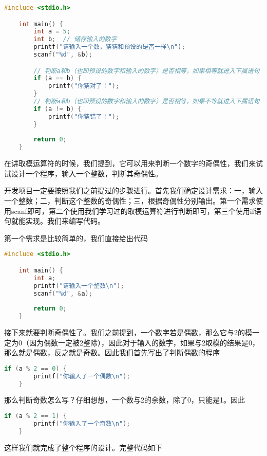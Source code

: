\begin{lstlisting}[language=C]
    #include <stdio.h>

    int main() {
        int a = 5;
        int b;  // 储存输入的数字
        printf("请输入一个数，猜猜和预设的是否一样\n");
        scanf("%d", &b);

        // 判断a和b（也即预设的数字和输入的数字）是否相等，如果相等就进入下属语句
        if (a == b) {
            printf("你猜对了！");
        }
        // 判断a和b（也即预设的数字和输入的数字）是否相等，如果不等就进入下属语句
        if (a != b) {
            printf("你猜错了！");
        }
        
        return 0;
    }
\end{lstlisting}

在讲取模运算符的时候，我们提到，它可以用来判断一个数字的奇偶性，我们来试试设计一个程序，输入一个整数，判断其奇偶性。

开发项目一定要按照我们之前提过的步骤进行。首先我们确定设计需求：一，输入一个整数；二，判断这个整数的奇偶性；三，根据奇偶性分别输出。第一个需求使用scanf即可，第二个使用我们学习过的取模运算符进行判断即可，第三个使用if语句就能实现。我们来编写代码。

第一个需求是比较简单的，我们直接给出代码

\begin{lstlisting}[language=C]
    #include <stdio.h>

    int main() {
        int a;
        printf("请输入一个整数\n");
        scanf("%d", &a);
        
        return 0;
    }
\end{lstlisting}

接下来就要判断奇偶性了。我们之前提到，一个数字若是偶数，那么它与2的模一定为0（因为偶数一定被2整除），因此对于输入的数字，如果与2取模的结果是0，那么就是偶数，反之就是奇数。因此我们首先写出了判断偶数的程序

\begin{lstlisting}[language=C]
    if (a % 2 == 0) {
        printf("你输入了一个偶数\n");
    }
\end{lstlisting}

那么判断奇数怎么写？仔细想想，一个数与2的余数，除了0，只能是1。因此

\begin{lstlisting}[language=C]
    if (a % 2 == 1) {
        printf("你输入了一个奇数\n");
    }
\end{lstlisting}

这样我们就完成了整个程序的设计。完整代码如下


